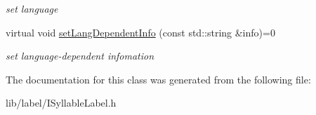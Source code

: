 \begin{DoxyCompactItemize}
\begin{DoxyCompactList}\small\item\em set language \end{DoxyCompactList}\item 
\hypertarget{classsinsy_1_1ISyllableLabel_aa6dee3cda59e6b20373c92341fd1b361}{virtual void \hyperlink{classsinsy_1_1ISyllableLabel_aa6dee3cda59e6b20373c92341fd1b361}{set\-Lang\-Dependent\-Info} (const std\-::string \&info)=0}\label{classsinsy_1_1ISyllableLabel_aa6dee3cda59e6b20373c92341fd1b361}

\begin{DoxyCompactList}\small\item\em set language-\/dependent infomation \end{DoxyCompactList}\end{DoxyCompactItemize}


\-The documentation for this class was generated from the following file\-:\begin{DoxyCompactItemize}
\item 
lib/label/\-I\-Syllable\-Label.\-h\end{DoxyCompactItemize}
